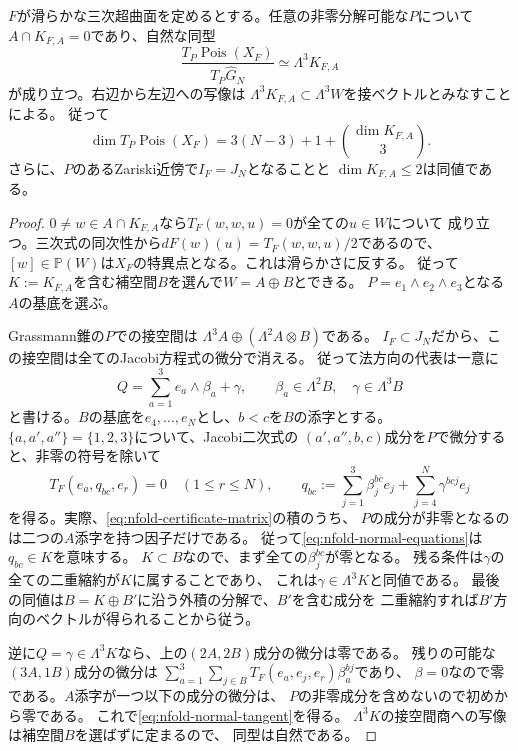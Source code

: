 \begin{theorem}[非零分解可能点の法方向]\label{thm:nfold-normal-tangent}
$F$が滑らかな三次超曲面を定めるとする。任意の非零分解可能な$P$について
$A\cap K_{F,A}=0$であり、自然な同型
\begin{equation}\label{eq:nfold-normal-tangent}
 \frac{T_P\operatorname{Pois}(X_F)}{T_P\widehat G_N}
       \simeq\Lambda^3K_{F,A}
\end{equation}
が成り立つ。右辺から左辺への写像は
$\Lambda^3K_{F,A}\subset\Lambda^3W$を接ベクトルとみなすことによる。
従って
\[
 \dim T_P\operatorname{Pois}(X_F)
 =3(N-3)+1+\binom{\dim K_{F,A}}3.
\]
さらに、$P$のあるZariski近傍で$I_F=J_N$となることと
$\dim K_{F,A}\le2$は同値である。
\end{theorem}
\begin{proof}
$0\ne w\in A\cap K_{F,A}$なら$T_F(w,w,u)=0$が全ての$u\in W$について
成り立つ。三次式の同次性から$dF(w)(u)=T_F(w,w,u)/2$であるので、
$[w]\in\mathbb P(W)$は$X_F$の特異点となる。これは滑らかさに反する。
従って$K:=K_{F,A}$を含む補空間$B$を選んで$W=A\oplus B$とできる。
$P=e_1\wedge e_2\wedge e_3$となる$A$の基底を選ぶ。

Grassmann錐の$P$での接空間は
$\Lambda^3A\oplus(\Lambda^2A\otimes B)$である。
$I_F\subset J_N$だから、この接空間は全てのJacobi方程式の微分で消える。
従って法方向の代表は一意に
\[
 Q=\sum_{a=1}^3e_a\wedge\beta_a+\gamma,
 \qquad\beta_a\in\Lambda^2B,\quad\gamma\in\Lambda^3B
\]
と書ける。$B$の基底を$e_4,\ldots,e_N$とし、$b<c$を$B$の添字とする。
$\{a,a',a''\}=\{1,2,3\}$について、Jacobi二次式の
$(a',a'',b,c)$成分を$P$で微分すると、非零の符号を除いて
\begin{equation}\label{eq:nfold-normal-equations}
 T_F(e_a,q_{bc},e_r)=0\quad(1\le r\le N),\qquad
 q_{bc}:=\sum_{j=1}^3\beta_j^{bc}e_j
             +\sum_{j=4}^N\gamma^{bcj}e_j
\end{equation}
を得る。実際、\eqref{eq:nfold-certificate-matrix}の積のうち、
$P$の成分が非零となるのは二つの$A$添字を持つ因子だけである。
従って\eqref{eq:nfold-normal-equations}は$q_{bc}\in K$を意味する。
$K\subset B$なので、まず全ての$\beta_j^{bc}$が零となる。
残る条件は$\gamma$の全ての二重縮約が$K$に属することであり、
これは$\gamma\in\Lambda^3K$と同値である。
最後の同値は$B=K\oplus B'$に沿う外積の分解で、$B'$を含む成分を
二重縮約すれば$B'$方向のベクトルが得られることから従う。

逆に$Q=\gamma\in\Lambda^3K$なら、上の$(2A,2B)$成分の微分は零である。
残りの可能な$(3A,1B)$成分の微分は
$\sum_{a=1}^3\sum_{j\in B}T_F(e_a,e_j,e_r)\beta_a^{bj}$であり、
$\beta=0$なので零である。$A$添字が一つ以下の成分の微分は、
$P$の非零成分を含めないので初めから零である。
これで\eqref{eq:nfold-normal-tangent}を得る。
$\Lambda^3K$の接空間商への写像は補空間$B$を選ばずに定まるので、
同型は自然である。


\end{proof}
